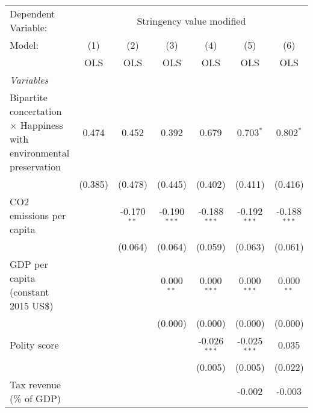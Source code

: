 
\begingroup
\centering
\begin{tabular}{lcccccc}
   \toprule
   Dependent Variable: & \multicolumn{6}{c}{Stringency value modified}\\
   Model:                                                                     & (1)     & (2)           & (3)            & (4)            & (5)            & (6)\\  
                                                                              &  OLS    & OLS           & OLS            & OLS            & OLS            & OLS\\  
   \midrule
   \emph{Variables}\\
   Bipartite concertation $\times$ Happiness with environmental preservation  & 0.474   & 0.452         & 0.392          & 0.679          & 0.703$^{*}$    & 0.802$^{*}$\\   
                                                                              & (0.385) & (0.478)       & (0.445)        & (0.402)        & (0.411)        & (0.416)\\   
   CO2 emissions per capita                                                   &         & -0.170$^{**}$ & -0.190$^{***}$ & -0.188$^{***}$ & -0.192$^{***}$ & -0.188$^{***}$\\   
                                                                              &         & (0.064)       & (0.064)        & (0.059)        & (0.063)        & (0.061)\\   
   GDP per capita (constant 2015 US\$)                                        &         &               & 0.000$^{**}$   & 0.000$^{***}$  & 0.000$^{***}$  & 0.000$^{**}$\\   
                                                                              &         &               & (0.000)        & (0.000)        & (0.000)        & (0.000)\\   
   Polity score                                                               &         &               &                & -0.026$^{***}$ & -0.025$^{***}$ & 0.035\\   
                                                                              &         &               &                & (0.005)        & (0.005)        & (0.022)\\   
   Tax revenue (\% of GDP)                                                    &         &               &                &                & -0.002         & -0.003\\   

\end{tabular}
